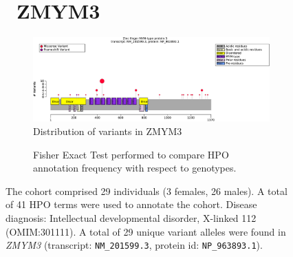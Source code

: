 \begin{figure}[htbp]
\section*{ ZMYM3}
\centering
\begin{subfigure}[b]{0.95\textwidth}
\centering
\includegraphics[width=\textwidth]{ img/ZMYM3_protein_diagram.pdf} 
\captionsetup{justification=raggedright,singlelinecheck=false}
\caption{Distribution of variants in ZMYM3}
\end{subfigure}

\vspace{2em}

\begin{subfigure}[b]{0.95\textwidth}
\centering
{}
\captionsetup{justification=raggedright,singlelinecheck=false}
\caption{Fisher Exact Test performed to compare HPO annotation frequency with respect to genotypes.}
\end{subfigure}

\vspace{2em}

\caption{The cohort comprised 29 individuals (3 females, 26 males). A total of 41 HPO terms were used to annotate the cohort. 
Disease diagnosis: Intellectual developmental disorder, X-linked 112 (OMIM:301111). 
 A total of 29 unique variant alleles were found in \textit{ZMYM3} (transcript: \texttt{NM\_201599.3}, 
 protein id: \texttt{NP\_963893.1}).}
\end{figure}
